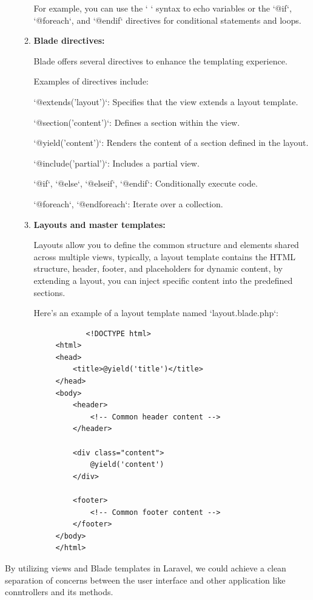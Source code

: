 \begin{itemize}
\begin{enumerate}
        For example, you can use the `{{ }}` syntax to echo variables or the `@if`, `@foreach`, and `@endif` directives for conditional statements and loops.
        \item \textbf{Blade directives:}
        
        Blade offers several directives to enhance the templating experience.
        
        Examples of directives include:
         
        `@extends('layout')`: Specifies that the view extends a layout template.
        
        `@section('content')`: Defines a section within the view.
        
        `@yield('content')`: Renders the content of a section defined in the layout.
        
        `@include('partial')`: Includes a partial view.
        
        `@if`, `@else`, `@elseif`, `@endif`: Conditionally execute code.
        
        `@foreach`, `@endforeach`: Iterate over a collection.
    
        \item \textbf{Layouts and master templates:}
        
        Layouts allow you to define the common structure and elements shared across multiple views, typically, a layout template contains the HTML structure, header, footer, and placeholders for dynamic content, by extending a layout, you can inject specific content into the predefined sections.
        
        Here's an example of a layout template named `layout.blade.php`:
        \begin{verbatim}
            <!DOCTYPE html>
     <html>
     <head>
         <title>@yield('title')</title>
     </head>
     <body>
         <header>
             <!-- Common header content -->
         </header>

         <div class="content">
             @yield('content')
         </div>

         <footer>
             <!-- Common footer content -->
         </footer>
     </body>
     </html>
        \end{verbatim}
    \end{enumerate}
\end{itemize}
By utilizing views and Blade templates in Laravel, we could achieve a clean separation of concerns between the user interface and other application like conntrollers and its methods.
